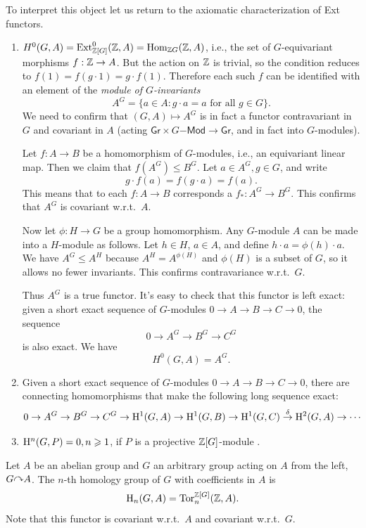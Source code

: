 To interpret this object let us return to the axiomatic characterization of Ext functors.

\begin{enumerate}
    \item $H^0(G,A)=\operatorname{Ext}^0_{\mathbb{Z}[G]}(\mathbb{Z},A)=\operatorname{Hom}_{\mathbb{Z} G}(\mathbb{Z},A)$, i.e., the set of $G$-equivariant morphisms $f:\mathbb{Z}\to A$. But the action on $\mathbb{Z}$ is trivial, so the condition reduces to $f(1)=f(g\cdot 1)=g\cdot f(1)$. Therefore each such $f$ can be identified with an element of the \emph{module of $G$-invariants}
    \[A^G=\{a\in A:g\cdot a=a\text{ for all }g\in G\}.\]
    We need to confirm that $(G,A)\mapsto A^G$ is in fact a functor contravariant in $G$ and covariant in $A$ (acting $\mathsf{Gr}\times G\mathsf{-Mod}\to \mathsf{Gr}$, and in fact into $G$-modules).

    Let $f:A\to B$ be a homomorphism of $G$-modules, i.e., an equivariant linear map. Then we claim that $f(A^G)\leq B^G$. Let $a\in A^G, g\in G$, and write
    \[g\cdot f(a)=f(g\cdot a)=f(a).\]
    This means that to each $f:A\to B$ corresponds a $f_\ast :A^G\to B^G$. This confirms that $A^G$ is covariant w.r.t.\ $A$.

    Now let $\phi:H\to G$ be a group homomorphism. Any $G$-module $A$ can be made into a $H$-module as follows. Let $h\in H$, $a\in A$, and define $h\cdot a=\phi(h)\cdot a$. We have $A^G\leq A^H$ because $A^H=A^{\phi(H)}$ and $\phi(H)$ is a subset of $G$, so it allows no fewer invariants. This confirms contravariance w.r.t.\ $G$. 
    
    Thus $A^G$ is a true functor. It's easy to check that this functor is left exact: given a short exact sequence of $G$-modules $0\to A\to B\to C\to 0$, the sequence
    \[0\to A^G\to B^G\to C^G\]
    is also exact. We have
    \[\boxed{H^0(G,A)=A^G.}\]
    
    \item Given a short exact sequence of $G$-modules $0\to A\to B\to C\to 0$, there are connecting homomorphisms that make the following long sequence exact:
    \[0\to A^G\to B^G\to C^G\to \mathrm{H}^1(G,A)\to \mathrm{H}^1(G,B)\to \mathrm{H}^1(G,C)\overset{\delta}{\to}\mathrm{H}^2(G,A)\to\cdots \]

    \item $\mathrm{H}^n(G,P)=0, n\geqslant 1$, if $P$ is a projective $\mathbb{Z}[G]$-module .
\end{enumerate}


\begin{defn}
    Let $A$ be an abelian group and $G$ an arbitrary group acting on $A$ from the left, $G\acts A$. The $n$-th homology group of $G$ with coefficients in $A$ is
    \[\mathrm{H}_n(G,A)=\operatorname{Tor}^{\mathbb{Z}[G]}_n(\mathbb{Z},A).\]
    Note that this functor is covariant w.r.t.\ $A$ and covariant w.r.t.\ $G$.
\end{defn}


